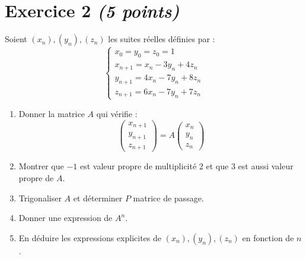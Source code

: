 \section*{Exercice 2 \hfill \normalfont\itshape (5 points)}
Soient $(x_n), (y_n), (z_n)$ les suites réelles définies par :
$$\begin{cases}
    x_0=y_0=z_0=1\\
    x_{n+1}=x_n-3y_n+4z_n\\
    y_{n+1}=4x_n-7y_n+8z_n\\
    z_{n+1}=6x_n-7y_n+7z_n
\end{cases}$$
\begin{enumerate}
\item Donner la matrice $A$ qui vérifie :
$$\begin{pmatrix}
 x_{n+1}\\
    y_{n+1}\\
    z_{n+1}  
\end{pmatrix}=A\begin{pmatrix}
 x_{n}\\
    y_{n}\\
    z_{n}  
\end{pmatrix}$$
    \item Montrer que $-1$ est valeur propre de multiplicité $2$ et que $3$ est aussi valeur propre de $A$.
    \item Trigonaliser $A$ et déterminer $P$ matrice de passage. 
    \item Donner une expression de $A^n$.
    \item En déduire les expressions explicites de $(x_n), (y_n), (z_n)$ en fonction de $n$.
\end{enumerate}

\vspace{2em}

